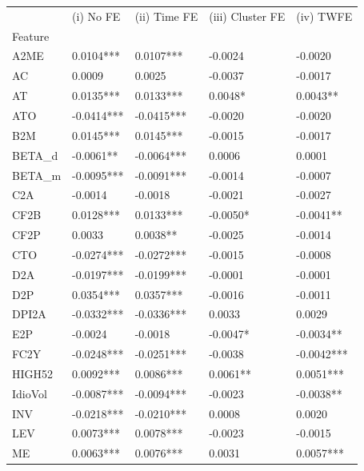 \begin{tabular}{lllll}
\toprule
{} &   (i) No FE & (ii) Time FE & (iii) Cluster FE &   (iv) TWFE \\
Feature &             &              &                  &             \\
\midrule
A2ME    &   0.0104*** &    0.0107*** &          -0.0024 &     -0.0020 \\
AC      &      0.0009 &       0.0025 &          -0.0037 &     -0.0017 \\
AT      &   0.0135*** &    0.0133*** &          0.0048* &    0.0043** \\
ATO     &  -0.0414*** &   -0.0415*** &          -0.0020 &     -0.0020 \\
B2M     &   0.0145*** &    0.0145*** &          -0.0015 &     -0.0017 \\
BETA\_d  &   -0.0061** &   -0.0064*** &           0.0006 &      0.0001 \\
BETA\_m  &  -0.0095*** &   -0.0091*** &          -0.0014 &     -0.0007 \\
C2A     &     -0.0014 &      -0.0018 &          -0.0021 &     -0.0027 \\
CF2B    &   0.0128*** &    0.0133*** &         -0.0050* &   -0.0041** \\
CF2P    &      0.0033 &     0.0038** &          -0.0025 &     -0.0014 \\
CTO     &  -0.0274*** &   -0.0272*** &          -0.0015 &     -0.0008 \\
D2A     &  -0.0197*** &   -0.0199*** &          -0.0001 &     -0.0001 \\
D2P     &   0.0354*** &    0.0357*** &          -0.0016 &     -0.0011 \\
DPI2A   &  -0.0332*** &   -0.0336*** &           0.0033 &      0.0029 \\
E2P     &     -0.0024 &      -0.0018 &         -0.0047* &   -0.0034** \\
FC2Y    &  -0.0248*** &   -0.0251*** &          -0.0038 &  -0.0042*** \\
HIGH52  &   0.0092*** &    0.0086*** &         0.0061** &   0.0051*** \\
IdioVol &  -0.0087*** &   -0.0094*** &          -0.0023 &   -0.0038** \\
INV     &  -0.0218*** &   -0.0210*** &           0.0008 &      0.0020 \\
LEV     &   0.0073*** &    0.0078*** &          -0.0023 &     -0.0015 \\
ME      &   0.0063*** &    0.0076*** &           0.0031 &   0.0057*** \\

\end{tabular}

